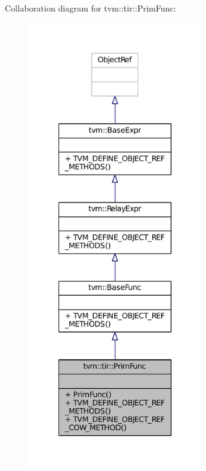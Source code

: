 Collaboration diagram for tvm\+:\+:tir\+:\+:Prim\+Func\+:
\nopagebreak
\begin{figure}[H]
\begin{center}
\leavevmode
\includegraphics[height=550pt]{classtvm_1_1tir_1_1PrimFunc__coll__graph}
\end{center}
\end{figure}

